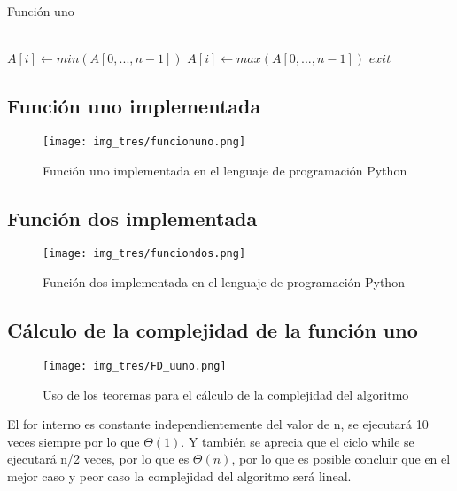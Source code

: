 \documentclass[12pt,twoside]{article}
\begin{document}
\begin{algorithm}[H]
    \caption{Función uno}
      \label{euclides}
      \begin{algorithmic}[1]
		\\
                      \State $A[i]\gets min(A[0,...,n-1])$
                      \State $A[i]\gets max(A[0,...,n-1])$
                      \Else
                      \State $exit$
                      \EndIf
					\EndFor
          \EndProcedure
		   \\
      \end{algorithmic}
  \end{algorithm}
\vspace{10 mm}
\subsection{Función uno implementada}
\begin{figure}[H]
\centering
\texttt{[image: img\_tres/funcionuno.png]}
\caption{Función uno implementada en el lenguaje de programación Python}

\label{ejecucionEuclides}
\end{figure}
\subsection{Función dos implementada}
\vspace{10 mm}
\begin{figure}[H]
\centering
\texttt{[image: img\_tres/funciondos.png]}
\caption{Función dos implementada en el lenguaje de programación Python}
\label{ejecucionEuclides}
\end{figure}
\subsection{Cálculo de la complejidad de la función uno}
\begin{figure}[h]
\centering
\texttt{[image: img\_tres/FD\_uuno.png]}
\caption{Uso de los teoremas para el cálculo de la complejidad del algoritmo}
\label{ejecucionEuclides}
\end{figure}
\vspace{10 mm}
El for interno es constante independientemente del valor de n, se ejecutará 10 veces siempre por lo que $\Theta(1)$. Y tambi\'{e}n se aprecia que el ciclo while se ejecutará n/2 veces, por lo que es $\Theta(n)$, por lo que es posible concluir que en el mejor caso y peor caso la complejidad del algoritmo será lineal.
\end{document}
